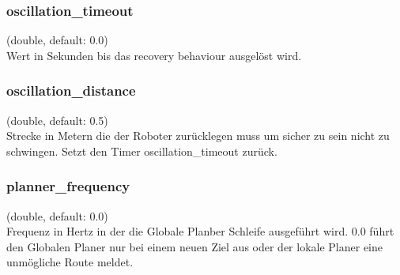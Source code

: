 \documentclass[oribibl]{llncs}
\begin{document}
\subsubsection{oscillation\_timeout} (double, default: 0.0)\\
	Wert in Sekunden bis das recovery behaviour ausgelöst wird.
\subsubsection{oscillation\_distance} (double, default: 0.5)\\
	Strecke in Metern die der Roboter zurücklegen muss um sicher zu sein nicht zu 	schwingen. Setzt den Timer oscillation\_timeout zurück.
\subsubsection{planner\_frequency} (double, default: 0.0)\\
	Frequenz in Hertz in der die Globale Planber Schleife ausgeführt wird.
	0.0 führt den Globalen Planer nur bei einem neuen Ziel aus oder der lokale Planer 	eine unmögliche Route meldet.	



\end{document}
